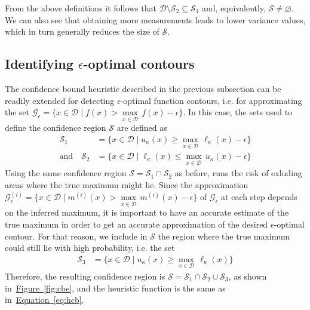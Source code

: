 \documentclass[11pt]{article} %
\newcommand{\figref}[1]{\hyperref[#1]{\mbox{Figure~\ref*{#1}}}}
\newcommand{\eqtref}[1]{\hyperref[#1]{\mbox{Equation~\ref*{#1}}}}
\begin{document}
From the above definitions it follows that 
$\mathcal{D}\setminus\mathcal{S}_2\subseteq\mathcal{S}_1$
and, equivalently, $\mathcal{S}\neq\varnothing$. We can also see that
obtaining more measurements leads to lower variance values, which in turn
generally reduces the size of $\mathcal{S}$.

\subsection{Identifying $\epsilon$-optimal contours}
The confidence bound heuristic described in the previous subsection can be
readily extended for detecting $\epsilon$-optimal function contours,
i.e. for approximating the set
${\mathcal{G}_{\epsilon} = \{x \in \mathcal{D} \mid f(x) > \underset{x \in \mathcal{D}}{\max}\,f(x) - \epsilon\}}$.
In this case, the sets used to define the confidence region $\mathcal{S}$
are defined as
\begin{align*}
  \mathcal{S}_1 &= \{x \in \mathcal{D} \mid u_{\kappa}(x) \geq \underset{x \in \mathcal{D}}{\max}\,\ell_{\kappa}(x) - \epsilon\}\\
  \text{and}\hspace{1em}
  \mathcal{S}_2 &= \{x \in \mathcal{D} \mid \ell_{\kappa}(x) \leq \underset{x \in \mathcal{D}}{\max}\,u_{\kappa}(x) - \epsilon\}
\end{align*}
Using the same confidence region $\mathcal{S} = \mathcal{S}_1\cap\mathcal{S}_2$
as before, runs the risk of exluding areas where the true maximum might lie.
Since the approximation
${\mathcal{G}^{(i)}_\epsilon = \{x \in \mathcal{D} \mid m^{(i)}(x) > \underset{x \in \mathcal{D}}{\max}\,m^{(i)}(x) - \epsilon\}}$
of $\mathcal{G}_{\epsilon}$ at each step
depends on the inferred maximum, it is important to have an accurate estimate
of the true maximum in order to get an accurate approximation of the desired
$\epsilon$-optimal contour. For that reason, we include in $\mathcal{S}$ the
region where the true maximum could still lie with high probability, i.e.
the set
\begin{align*}
  \mathcal{S}_3 &= \{x \in \mathcal{D} \mid u_{\kappa}(x) \geq \underset{x \in \mathcal{D}}{\max}\,\ell_{\kappa}(x)\}
\end{align*}
Therefore, the resulting confidence region is
$\mathcal{S} = \mathcal{S}_1\cap\mathcal{S}_2\cup\mathcal{S}_3$, as shown
in~\figref{fig:cbe}, and the heuristic function is the same as
in~\eqtref{eq:hcb}.
\end{document}
